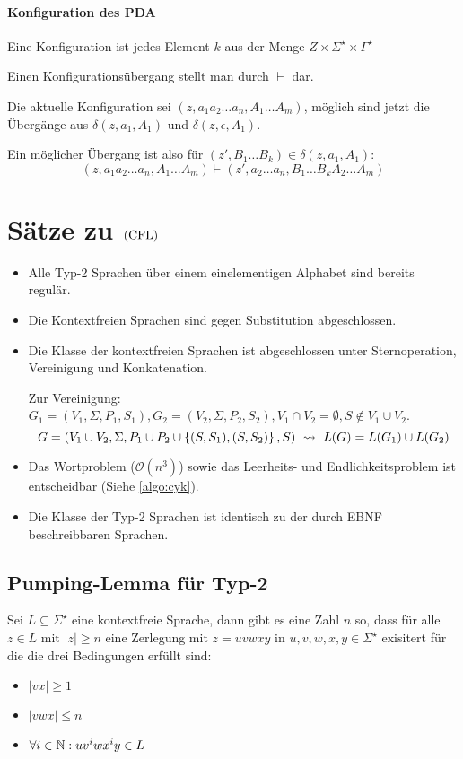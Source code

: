 \paragraph{Konfiguration des PDA}
Eine Konfiguration ist jedes Element $k$ aus der Menge $Z\times\Sigma^\star\times\Gamma^\star$

Einen Konfigurationsübergang stellt man durch $\vdash$ dar.

Die aktuelle Konfiguration sei $(z,a_1a_2\ldots a_n,A_1\ldots A_m)$, möglich sind jetzt die Übergänge aus $\delta(z,a_1,A_1)$ und $\delta(z,\epsilon,A_1)$.

Ein möglicher Übergang ist also für $(z',B_1\ldots B_k)\in\delta(z,a_1,A_1)$:
\begin{equation*}
	(z,a_1a_2\ldots a_n,A_1\ldots A_m)\vdash (z',a_2\ldots a_n,B_1\ldots B_kA_2\ldots A_m)
\end{equation*}



\section{Sätze zu $\mathrm{(CFL)}$}
\begin{itemize}
	\item Alle Typ-2 Sprachen über einem einelementigen Alphabet sind bereits regulär.
	\item Die Kontextfreien Sprachen sind gegen Substitution abgeschlossen.
	\item Die Klasse der kontextfreien Sprachen ist abgeschlossen unter Sternoperation, Vereinigung und Konkatenation.

	Zur Vereinigung: $G_1=(V_1,\Sigma, P_1,S_1), G_2=(V_2,\Sigma, P_2,S_2), V_1\cap V_2=\emptyset, S\not\in V_1\cup V_2$.
	\begin{equation*}
		G=(V_1\cup V_2, \Sigma, P_1\cup P_2\cup\simpleset{(S,S_1),(S,S_2)},S) \ \rightsquigarrow\  L(G)=L(G_1)\cup L(G_2)
	\end{equation*}
	\item Das Wortproblem ($\mathcal O(n^3)$) sowie das Leerheits- und Endlichkeitsproblem ist entscheidbar (Siehe \autoref{algo:cyk}).
	\item Die Klasse der Typ-2 Sprachen ist identisch zu der durch EBNF beschreibbaren Sprachen.
\end{itemize}
\subsection{Pumping-Lemma für Typ-2}
Sei $L\subseteq \Sigma^\star$ eine kontextfreie Sprache, dann gibt es eine Zahl $n$ so, dass für alle $z\in L$ mit $|z|\geq n$ eine Zerlegung mit $z=uvwxy$ in $u,v,w,x,y\in\Sigma^\star$ exisitert für die die drei Bedingungen erfüllt sind:
\begin{itemize}
	\item $|vx|\geq 1$
	\item $|vwx|\leq n$
	\item $\forall i\in\mathbb{N}: uv^iwx^iy\in L$
\end{itemize}


